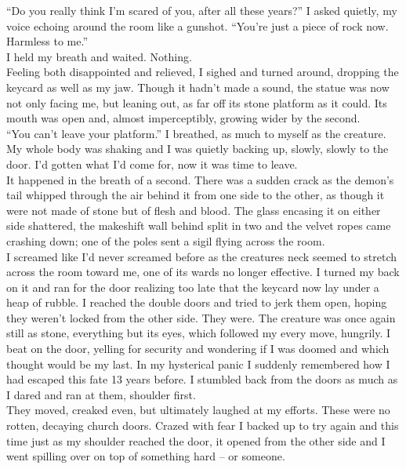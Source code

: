 \documentclass[a5paper]{scrartcl}
\begin{document}
\enquote{Do you really think I'm scared of you, after all these years?} I asked quietly, my voice echoing around the room like a gunshot. \enquote{You're just a piece of rock now. Harmless to me.} \\


I held my breath and waited. Nothing.\\


Feeling both disappointed and relieved, I sighed and turned around, dropping the keycard as well as my jaw. Though it hadn't made a sound, the statue was now not only facing me, but leaning out, as far off its stone platform as it could. Its mouth was open and, almost imperceptibly, growing wider by the second. \\


\enquote{You can't leave your platform.} I breathed, as much to myself as the creature. My whole body was shaking and I was quietly backing up, slowly, slowly to the door. I'd gotten what I'd come for, now it was time to leave.\\


It happened in the breath of a second. There was a sudden crack as the demon's tail whipped through the air behind it from one side to the other, as though it were not made of stone but of flesh and blood. The glass encasing it on either side shattered, the makeshift wall behind split in two and the velvet ropes came crashing down; one of the poles sent a sigil flying across the room. \\


I screamed like I'd never screamed before as the creatures neck seemed to stretch across the room toward me, one of its wards no longer effective. I turned my back on it and ran for the door realizing too late that the keycard now lay under a heap of rubble. I reached the double doors and tried to jerk them open, hoping they weren't locked from the other side. They were.  The creature was once again still as stone, everything but its eyes, which followed my every move, hungrily.
I beat on the door, yelling for security and wondering if I was doomed and which thought would be my last. In my hysterical panic I suddenly remembered how I had escaped this fate 13 years before. I stumbled back from the doors as much as I dared and ran at them, shoulder first.\\


They moved, creaked even, but ultimately laughed at my efforts. These were no rotten, decaying church doors. Crazed with fear I backed up to try again and this time just as my shoulder reached the door, it opened from the other side and I went spilling over on top of something hard -- or someone. \\
\end{document}

